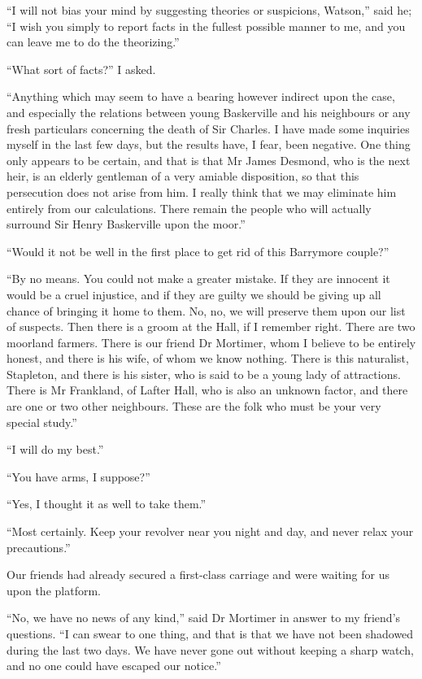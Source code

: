 \documentclass[paper=a5,BCOR=7mm,twoside,DIV=calc,12pt,usegeometry,openany,chapterprefix,endperiod,headings=big]{scrbook} %
\begin{document}
\enquote{I will not bias your mind by suggesting theories or suspicions, Watson,} said he; \enquote{I wish you simply to report facts in the fullest possible manner to me, and you can leave me to do the theorizing.}

\enquote{What sort of facts?} I asked.

\enquote{Anything which may seem to have a bearing however indirect upon the case, and especially the relations between young Baskerville and his neighbours or any fresh particulars concerning the death of Sir Charles. I have made some inquiries myself in the last few days, but the results have, I fear, been negative. One thing only appears to be certain, and that is that Mr James Desmond, who is the next heir, is an elderly gentleman of a very amiable disposition, so that this persecution does not arise from him. I really think that we may eliminate him entirely from our calculations. There remain the people who will actually surround Sir Henry Baskerville upon the moor.}

\enquote{Would it not be well in the first place to get rid of this Barrymore couple?}

\enquote{By no means. You could not make a greater mistake. If they are innocent it would be a cruel injustice, and if they are guilty we should be giving up all chance of bringing it home to them. No, no, we will preserve them upon our list of suspects. Then there is a groom at the Hall, if I remember right. There are two moorland farmers. There is our friend Dr Mortimer, whom I believe to be entirely honest, and there is his wife, of whom we know nothing. There is this naturalist, Stapleton, and there is his sister, who is said to be a young lady of attractions. There is Mr Frankland, of Lafter Hall, who is also an unknown factor, and there are one or two other neighbours. These are the folk who must be your very special study.}

\enquote{I will do my best.}

\enquote{You have arms, I suppose?}

\enquote{Yes, I thought it as well to take them.}

\enquote{Most certainly. Keep your revolver near you night and day, and never relax your precautions.}

Our friends had already secured a first-class carriage and were waiting for us upon the platform.

\enquote{No, we have no news of any kind,} said Dr Mortimer in answer to my friend's questions. \enquote{I can swear to one thing, and that is that we have not been shadowed during the last two days. We have never gone out without keeping a sharp watch, and no one could have escaped our notice.}
\end{document}
